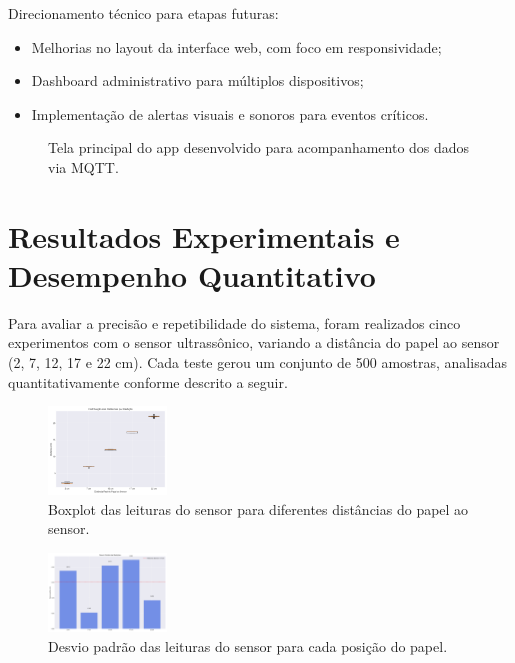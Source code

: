 \documentclass[english,hidelinks]{sbrt}
\begin{document}
Direcionamento técnico para etapas futuras:
\begin{itemize}
    \item Melhorias no layout da interface web, com foco em responsividade;
    \item Dashboard administrativo para múltiplos dispositivos;
    \item Implementação de alertas visuais e sonoros para eventos críticos.
\end{itemize}

\begin{figure}[H]
  \centering
  \caption{Tela principal do app desenvolvido para acompanhamento dos dados via MQTT.}
  \label{fig:app}
\end{figure}

\section{Resultados Experimentais e Desempenho Quantitativo}
Para avaliar a precisão e repetibilidade do sistema, foram realizados cinco experimentos com o sensor ultrassônico, variando a distância do papel ao sensor (2, 7, 12, 17 e 22 cm). Cada teste gerou um conjunto de 500 amostras, analisadas quantitativamente conforme descrito a seguir.


\begin{figure}[H]
    \centering
    \includegraphics[width=0.28\textwidth]{graficos/boxplot_distancias.png}
    \caption{Boxplot das leituras do sensor para diferentes distâncias do papel ao sensor.}
    \label{fig:boxplot_distancias}
\end{figure}

\begin{figure}[H]
    \centering
    \includegraphics[width=0.28\textwidth]{graficos/desvios_padrao.png}
    \caption{Desvio padrão das leituras do sensor para cada posição do papel.}
    \label{fig:desvios_padrao}
\end{figure}
\end{document}
